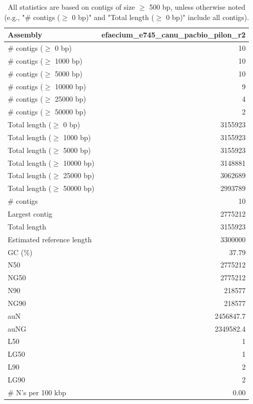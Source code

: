 \documentclass[12pt,a4paper]{article}
\begin{document}
\begin{table}[ht]
\begin{center}
\caption{All statistics are based on contigs of size $\geq$ 500 bp, unless otherwise noted (e.g., "\# contigs ($\geq$ 0 bp)" and "Total length ($\geq$ 0 bp)" include all contigs).}
\begin{tabular}{|l*{1}{|r}|}
\hline
Assembly & efaecium\_e745\_canu\_pacbio\_pilon\_r2 \\ \hline
\# contigs ($\geq$ 0 bp) & 10 \\ \hline
\# contigs ($\geq$ 1000 bp) & 10 \\ \hline
\# contigs ($\geq$ 5000 bp) & 10 \\ \hline
\# contigs ($\geq$ 10000 bp) & 9 \\ \hline
\# contigs ($\geq$ 25000 bp) & 4 \\ \hline
\# contigs ($\geq$ 50000 bp) & 2 \\ \hline
Total length ($\geq$ 0 bp) & 3155923 \\ \hline
Total length ($\geq$ 1000 bp) & 3155923 \\ \hline
Total length ($\geq$ 5000 bp) & 3155923 \\ \hline
Total length ($\geq$ 10000 bp) & 3148881 \\ \hline
Total length ($\geq$ 25000 bp) & 3062689 \\ \hline
Total length ($\geq$ 50000 bp) & 2993789 \\ \hline
\# contigs & 10 \\ \hline
Largest contig & 2775212 \\ \hline
Total length & 3155923 \\ \hline
Estimated reference length & 3300000 \\ \hline
GC (\%) & 37.79 \\ \hline
N50 & 2775212 \\ \hline
NG50 & 2775212 \\ \hline
N90 & 218577 \\ \hline
NG90 & 218577 \\ \hline
auN & 2456847.7 \\ \hline
auNG & 2349582.4 \\ \hline
L50 & 1 \\ \hline
LG50 & 1 \\ \hline
L90 & 2 \\ \hline
LG90 & 2 \\ \hline
\# N's per 100 kbp & 0.00 \\ \hline
\end{tabular}
\end{center}
\end{table}
\end{document}
